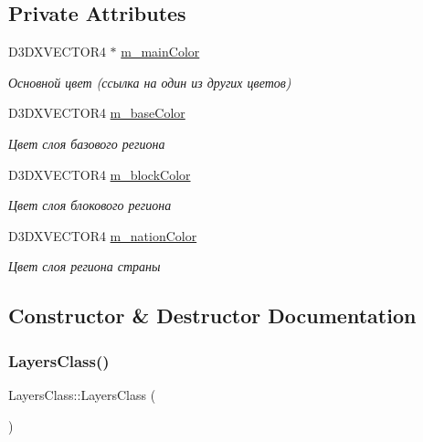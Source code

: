\subsection*{Private Attributes}
\begin{DoxyCompactItemize}
\item 
D3\+D\+X\+V\+E\+C\+T\+O\+R4 $\ast$ \hyperlink{class_layers_class_a4f6568a3075885bef47e3924ba2942c7}{m\+\_\+main\+Color}
\begin{DoxyCompactList}\small\item\em Основной цвет (ссылка на один из других цветов) \end{DoxyCompactList}\item 
D3\+D\+X\+V\+E\+C\+T\+O\+R4 \hyperlink{class_layers_class_a9a09cba30388dd686738e4a5afb0ceb5}{m\+\_\+base\+Color}
\begin{DoxyCompactList}\small\item\em Цвет слоя базового региона \end{DoxyCompactList}\item 
D3\+D\+X\+V\+E\+C\+T\+O\+R4 \hyperlink{class_layers_class_a8e305c4a712556e6924c7fc44e74399f}{m\+\_\+block\+Color}
\begin{DoxyCompactList}\small\item\em Цвет слоя блокового региона \end{DoxyCompactList}\item 
D3\+D\+X\+V\+E\+C\+T\+O\+R4 \hyperlink{class_layers_class_ab3ac3d76407316dff008f31b85303662}{m\+\_\+nation\+Color}
\begin{DoxyCompactList}\small\item\em Цвет слоя региона страны \end{DoxyCompactList}\end{DoxyCompactItemize}


\subsection{Constructor \& Destructor Documentation}
\mbox{\label{class_layers_class_af810e55733298ce7f0af317097a3b211}} 
\subsubsection{\texorpdfstring{Layers\+Class()}{LayersClass()}\hspace{0.1cm}{\footnotesize\ttfamily [1/2]}}
{\footnotesize\ttfamily Layers\+Class\+::\+Layers\+Class (\begin{DoxyParamCaption}{ }\end{DoxyParamCaption})}

